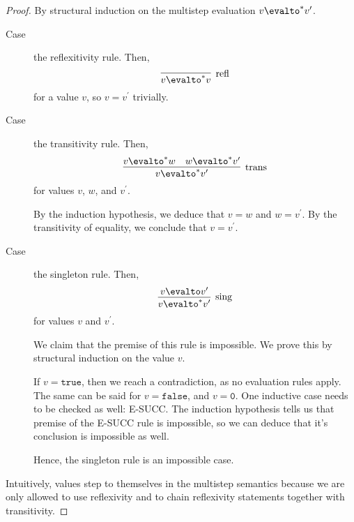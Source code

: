 \documentclass[11pt,letterpaper]{article}
\begin{document}
\begin{proof}
    By structural induction on the multistep evaluation $v \evalto^* v^\prime$.

    \begin{description}
        \item[Case] the reflexitivity rule. Then,
            \begin{equation*}
                \infer[\text{refl}]{v \evalto^* v}{}
            \end{equation*}
            for a value $v$,
            so $v = v^\prime$ trivially.

        \item[Case] the transitivity rule. Then,
            \begin{equation*}
                \infer[\text{trans}]{v \evalto^* v^\prime}{
                    v \evalto^* w
                    &
                    w \evalto^* v^\prime
                }
            \end{equation*}
            for values $v$, $w$, and $v^\prime$.

            By the induction hypothesis,
            we deduce that $v = w$ and $w = v^\prime$.
            By the transitivity of equality, we conclude that $v = v^\prime$.

        \item[Case] the singleton rule. Then,
            \begin{equation*}
                \infer[\text{sing}]{v \evalto^* v^\prime}{
                    v \evalto v^\prime
                }
            \end{equation*}
            for values $v$ and $v^\prime$.

            We claim that the premise of this rule is impossible. We prove this
            by structural induction on the value $v$.

            If $v = \mathtt{true}$, then we reach a contradiction, as no
            evaluation rules apply. The same can be said for
            $v = \mathtt{false}$, and $v = \mathtt{0}$.
            One inductive case needs to be checked as well: E-SUCC.
            The induction hypothesis tells us that premise of the E-SUCC rule
            is impossible, so we can deduce that it's conclusion is impossible
            as well.

            Hence, the singleton rule is an impossible case.
    \end{description}

    Intuitively, values step to themselves in the multistep semantics because
    we are only allowed to use reflexivity and to chain reflexivity statements
    together with transitivity.
\end{proof}
\end{document}
